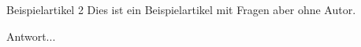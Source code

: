 \begin{artikel}{Beispielartikel 2}
Dies ist ein Beispielartikel mit Fragen aber ohne Autor.

Antwort...
\end{artikel}

